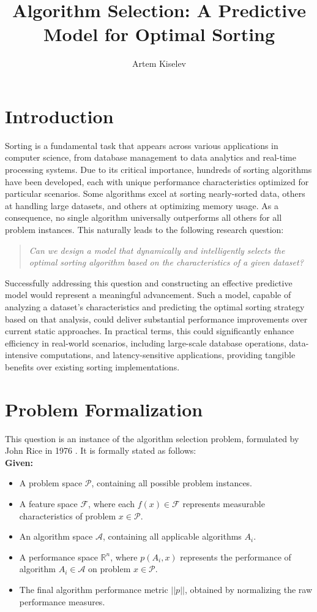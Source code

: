 \documentclass[twocolumn]{article}
\title{Algorithm Selection: A Predictive Model for Optimal Sorting}
\author{Artem Kiselev}
\begin{document}
\maketitle

\section{Introduction}
Sorting is a fundamental task that appears across various applications in computer science, from database management to data analytics and real-time processing systems. Due to its critical importance, hundreds of sorting algorithms have been developed, each with unique performance characteristics optimized for particular scenarios. Some algorithms excel at sorting nearly-sorted data, others at handling large datasets, and others at optimizing memory usage. As a consequence, no single algorithm universally outperforms all others for all problem instances. This naturally leads to the following research question:

\begin{quote}
\emph{Can we design a model that dynamically and intelligently selects the optimal sorting algorithm based on the characteristics of a given dataset?}
\end{quote}

Successfully addressing this question and constructing an effective predictive model would represent a meaningful advancement. Such a model, capable of analyzing a dataset's characteristics and predicting the optimal sorting strategy based on that analysis, could deliver substantial performance improvements over current static approaches. In practical terms, this could significantly enhance efficiency in real-world scenarios, including large-scale database operations, data-intensive computations, and latency-sensitive applications, providing tangible benefits over existing sorting implementations.

\section{Problem Formalization}
This question is an instance of the algorithm selection problem, formulated by John Rice in 1976 \cite{ricealgorithmselection}. It is formally stated as follows: \\
\textbf{Given:}
\begin{itemize}
    \item A problem space $\mathcal{P}$, containing all possible problem instances.
    \item A feature space $\mathcal{F}$, where each $f(x) \in \mathcal{F}$ represents measurable characteristics of problem $x \in \mathcal{P}$.
    \item An algorithm space $\mathcal{A}$, containing all applicable algorithms $A_i$.
    \item A performance space $\mathbb{R}^n$, where $p(A_i,x)$ represents the performance of algorithm $A_i \in \mathcal{A}$ on problem $x \in \mathcal{P}$.
    \item The final algorithm performance metric $||p||$, obtained by normalizing the raw performance measures.
\end{itemize}
\end{document}
